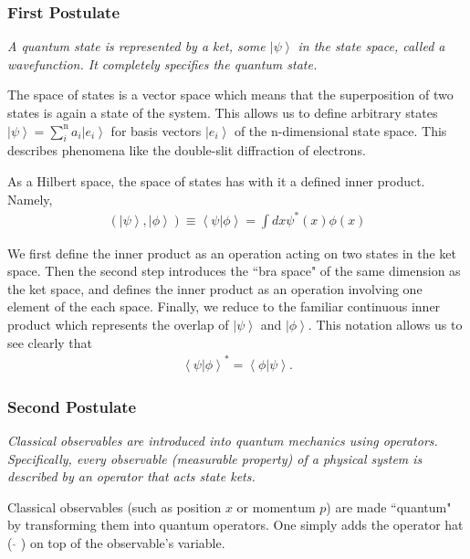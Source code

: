 \documentclass[11pt]{article} %
\newcommand{\ket}[1]{\left|#1\right\rangle}
\newcommand{\braket}[2]{\left\langle#1 |  #2\right\rangle}
\begin{document}
\subsubsection{First Postulate}
\begin{center}
    \textit{A quantum state is represented by a ket, some $\ket{\psi}$ in the state space, called a wavefunction. It completely specifies the quantum state.}
\end{center}

The space of states is a vector space which means that the superposition of two states is again a state of the system. This allows us to define arbitrary states $\ket{\psi} = \sum^\textrm{n}_ia_i\ket{e_i}$ for basis vectors $\ket{e_i}$ of the n-dimensional state space. This describes phenomena like the double-slit diffraction of electrons.

As a Hilbert space, the space of states has with it a defined inner product. Namely,
\begin{align}
    \left(\ket{\psi},\ket{\phi}\right) \equiv \braket{\psi}{\phi} = \int dx\psi^\ast(x)\phi(x)
\end{align}

We first define the inner product as an operation acting on two states in the ket space. Then the second step introduces the ``bra space" of the same dimension as the ket space, and defines the inner product as an operation involving one element of the each space. Finally, we reduce to the familiar continuous inner product which represents the overlap of $\ket{\psi}$ and $\ket{\phi}$. This notation allows us to see clearly that
\begin{align}
    \braket{\psi}{\phi}^\ast = \braket{\phi}{\psi}.
\end{align}

\subsubsection{Second Postulate}
\begin{center}
    \textit{Classical observables are introduced into quantum mechanics using operators. Specifically, every observable (measurable property) of a physical system is described by an operator that acts state kets.}
\end{center}

Classical observables (such as position $x$ or momentum $p$) are made ``quantum" by transforming them into quantum operators. One simply adds the operator hat ( $\hat{ }$ ) on top of the observable's variable.
\end{document}
